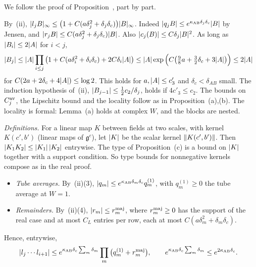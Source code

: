 \begin{detail}\label{xa:d-AB-iii}
We follow the proof of Proposition~, part by part.
\begin{step}
By~(ii), $\lvert l_jB\rvert_\infty\le\big(1+C(a\delta_j^2+\delta_j\delta_c)\big)\lvert B\rvert_\infty$. Indeed $\lvert q_jB\rvert\le e^{\kappa_{\rm AB}\delta_j\delta_c}\lvert B\rvert$ by Jensen, and $\lvert r_jB\rvert\le C(a\delta_j^2+\delta_j\delta_c)\lvert B\rvert$. Also $\lvert c_j(B)\rvert\le C\delta_j\lvert B\rvert^2$. As long as $\lvert B_i\rvert\le2\lvert A\rvert$ for $i<j$,
\[
\lvert B_j\rvert\le\lvert A\rvert\prod_{i\le j}\big(1+C(a\delta_i^2+\delta_i\delta_c)+2C\delta_i\lvert A\rvert\big)\le\lvert A\rvert\exp\Big(C\big(\tfrac98a+\tfrac32\delta_c+3\lvert A\rvert\big)\Big)\le2\lvert A\rvert
\]
for $C(2a+2\delta_c+4\lvert A\rvert)\le\log2$. This holds for $a,\lvert A\rvert\le c'_3$ and $\delta_c<\delta_{AB}$ small. The induction hypothesis of~(ii), $\lvert B_{j-1}\rvert\le\frac12c_2/\delta_j$, holds if $4c'_3\le c_2$. The bounds on $C^{\rm av}_j$, the Lipschitz bound and the locality follow as in Proposition~(a),(b). The locality is formal: Lemma~(a) holds at complex $W$, and the blocks are nested.
\end{step}

\begin{step}
\emph{Definitions.} For a linear map $K$ between fields at two scales, with kernel $K(c',b')$ (linear maps of $\mathfrak g^c$), let $\lvert K\rvert$ be the scalar kernel $\lVert K(c',b')\rVert$. Then $\lvert K_1K_2\rvert\le\lvert K_1\rvert\,\lvert K_2\rvert$ entrywise. The type of Proposition~(c) is a bound on $\lvert K\rvert$ together with a support condition. So type bounds for nonnegative kernels compose as in the real proof.
\begin{itemize}
\item \emph{Tube averages.} By~(ii)(3), $\lvert q_m\rvert\le e^{\kappa_{\rm AB}\delta_m\delta_c}q^{(1)}_m$, with $q^{(1)}_m\ge0$ the tube average at $W=1$.
\item \emph{Remainders.} By~(ii)(4), $\lvert r_m\rvert\le r^{\rm maj}_m$, where $r^{\rm maj}_m\ge0$ has the support of the real case and at most $C_L$ entries per row, each at most $C(a\delta_m^2+\delta_m\delta_c)$.
\end{itemize}
Hence, entrywise,
\[
\lvert l_j\cdots l_{i+1}\rvert\le e^{\kappa_{\rm AB}\delta_c\sum_m\delta_m}\prod_m\big(q^{(1)}_m+r^{\rm maj}_m\big),\qquad e^{\kappa_{\rm AB}\delta_c\sum_m\delta_m}\le e^{2\kappa_{\rm AB}\delta_c}.
\]


\end{step}
\end{detail}
